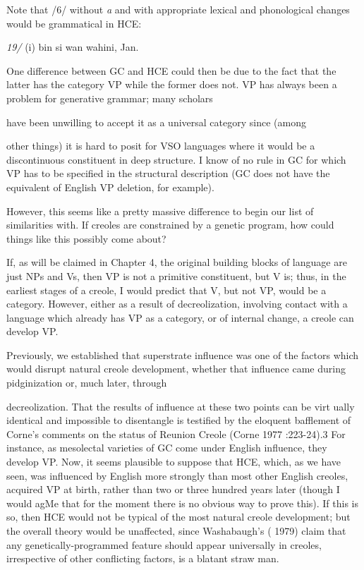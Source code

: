 Note that /6/ without \textit{a} and with appropriate lexical and phonological changes would be grammatical in HCE:

\textit{19/ }(i) bin si wan wahini, Jan.

One difference between GC and HCE could then be due to the fact that the latter has the category VP while the former does not. VP has always been a problem for generative grammar; many scholars

have been unwilling to accept it as a universal category since (among

other things) it is hard to posit for VSO languages where it would be a discontinuous constituent in deep structure. I know of no rule in GC for which VP has to be specified in the structural description (GC does not have the equivalent of English VP deletion, for example).

However, this seems like a pretty massive difference to begin our list of similarities with. If creoles are constrained by a genetic program, how could things like this possibly come about?

If, as will be claimed in Chapter 4, the original building blocks of language are just NPs and Vs, then VP is not a primitive constituent, but V is; thus, in the earliest stages of a creole, I would predict that V, but not VP, would be a category. However, either as a result of de\-creolization, involving contact with a language which already has VP as a category, or of internal change, a creole can develop VP.

Previously, we established that superstrate influence was one of the factors which would disrupt natural creole development, whether that influence came during pidginization or, much later, through


decreolization. That the results of influence at these two points can be virt ually identical and impossible to disentangle is testified by the elo\-quent bafflement of Corne's comments on the status of Reunion Creole (Corne 1977 :223{}-24).3 For instance, as mesolectal varieties of GC come under English influence, they develop VP. Now, it seems plausible to suppose that HCE, which, as we have seen, was influenced by English more strongly than most other English creoles, acquired VP at birth, rather than two or three hundred years later (though I would agMe that for the moment there is no obvious way to prove this). If this is so, then HCE would not be typical of the most natural creole development; but the overall theory would be unaffected, since Washabaugh's ( 1979) claim that any genetically-programmed feature should appear universally in creoles, irrespective of other conflicting factors, is a blatant straw man.

